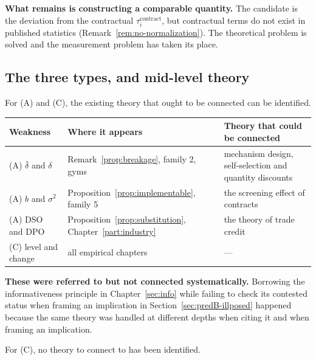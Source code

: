 \textbf{What remains is constructing a comparable quantity.} The candidate is the deviation
from the contractual $\tau_i^{\mathrm{contract}}$, but contractual terms do not exist in
published statistics (Remark~\ref{rem:no-normalization}). The theoretical problem is solved
and the measurement problem has taken its place.

\subsection{The three types, and mid-level theory}

For (A) and (C), the existing theory that ought to be connected can be identified.

\begin{center}
\begin{tabularx}{\textwidth}{@{}lXX@{}}
\toprule
Weakness & Where it appears & Theory that could be connected \\
\midrule
(A) $\bar\delta$ and $\delta$ & Remark~\ref{prop:breakage}, family 2, gyms & mechanism design, self-selection and quantity discounts \\
(A) $b$ and $\sigma^2$ & Proposition~\ref{prop:implementable}, family 5 & the screening effect of contracts \\
(A) DSO and DPO & Proposition~\ref{prop:substitution}, Chapter~\ref{part:industry} & the theory of trade credit \\
(C) level and change & all empirical chapters & --- \\
\bottomrule
\end{tabularx}
\label{tab:weakness-mid-level-theory}
\end{center}

\textbf{These were referred to but not connected systematically.} Borrowing the informativeness
principle in Chapter~\ref{sec:info} while failing to check its contested status when framing
an implication in Section~\ref{sec:predB-illposed} happened because the same theory was
handled at different depths when citing it and when framing an implication.

For (C), no theory to connect to has been identified.
